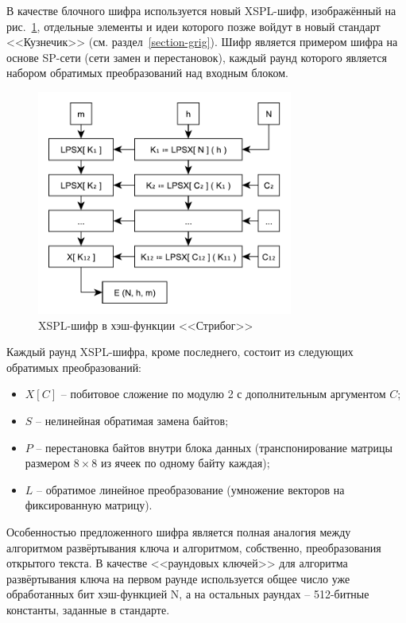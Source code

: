 В качестве блочного шифра используется новый XSPL-шифр, изображённый на рис.~\ref{fig:stribog-xspl}, отдельные элементы и идеи которого позже войдут в новый стандарт <<Кузнечик>> (см. раздел~\ref{section-grig}). Шифр является примером шифра на основе SP-сети (сети замен и перестановок), каждый раунд которого является набором обратимых преобразований над входным блоком.

\begin{figure}[htb]
	\centering
	\includegraphics[width=0.75\textwidth]{pic/stribog-xspl}
  \caption{XSPL-шифр в хэш-функции <<Стрибог>>}
  \label{fig:stribog-xspl}
\end{figure}

Каждый раунд XSPL-шифра, кроме последнего, состоит из следующих обратимых преобразований:
\begin{itemize}
	\item $X\left[C\right]$ -- побитовое сложение по модулю 2 с дополнительным аргументом $C$;
	\item $S$ -- нелинейная обратимая замена байтов;
	\item $P$ -- перестановка байтов внутри блока данных (транспонирование матрицы размером $8 \times 8$ из ячеек по одному байту каждая);
	\item $L$ -- обратимое линейное преобразование (умножение векторов на фиксированную матрицу).
\end{itemize}

Особенностью предложенного шифра является полная аналогия между алгоритмом развёртывания ключа и алгоритмом, собственно, преобразования открытого текста. В качестве <<раундовых ключей>> для алгоритма развёртывания ключа на первом раунде используется общее число уже обработанных бит хэш-функцией N, а на остальных раундах -- 512-битные константы, заданные в стандарте.

